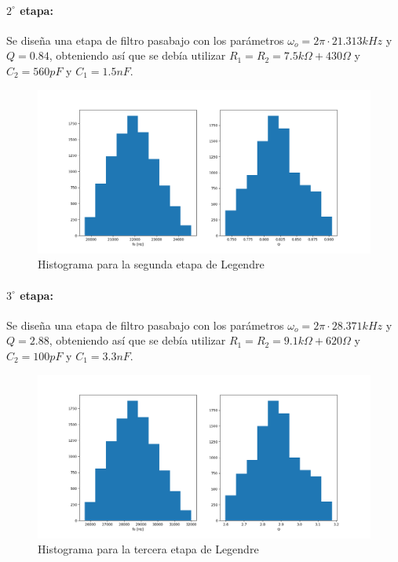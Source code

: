 \paragraph{$2^{\circ}$ etapa:} Se dise\~na una etapa de filtro pasabajo con los par\'ametros $\omega_o = 2 \pi \cdot 21.313kHz$ y $Q = 0.84$, obteniendo as\'i que se deb\'ia utilizar $R_1 = R_2 = 7.5k\Omega + 430 \Omega$ y $C_2 = 560pF$ y $C_1 = 1.5nF$.

\begin{figure}[H]
	\centering
	\includegraphics[scale=0.4]{../EJ1/Recursos/legendre_histogram_two.png}
	\caption{Histograma para la segunda etapa de Legendre}
	\label{fig:legendre_histogram_two}
\end{figure}

\paragraph{$3^{\circ}$ etapa:} Se dise\~na una etapa de filtro pasabajo con los par\'ametros $\omega_o = 2 \pi \cdot 28.371kHz$ y $Q = 2.88$, obteniendo as\'i que se deb\'ia utilizar $R_1 = R_2 = 9.1k\Omega + 620 \Omega$ y $C_2 = 100pF$ y $C_1 = 3.3nF$.

\begin{figure}[H]
	\centering
	\includegraphics[scale=0.4]{../EJ1/Recursos/legendre_histogram_three.png}
	\caption{Histograma para la tercera etapa de Legendre}
	\label{fig:legendre_histogram_three}
\end{figure}

